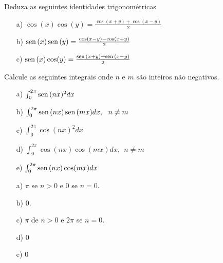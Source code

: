 \begin{exer} Deduza as seguintes identidades trigonométricas
\begin{itemize}
\item[a)] $\cos(x) \cos(y) = \frac {\cos(x+y) + \cos(x-y)}{2}$
\item[b)] $\operatorname{sen}\,(x) \operatorname{sen}\,(y) = \frac {\cos(x-y) - \cos(x+y)}{2}$
\item[c)] $\operatorname{sen}\,(x) \cos(y) = \frac {\operatorname{sen}\,(x+y) + \operatorname{sen}\,(x-y)}{2}$
\end{itemize}
\end{exer}
\begin{exer}Calcule as seguintes integrais onde $n$ e $m$ são inteiros não negativos.
\begin{itemize}
\item [a)] $\int_0^{2\pi}\operatorname{sen}\,(nx)^2dx$
\item [b)] $\int_0^{2\pi}\operatorname{sen}\,(nx)\operatorname{sen}\,(mx)dx,~~n\neq m$
\item [c)] $\int_0^{2\pi}\cos(nx)^2dx$
\item [d)] $\int_0^{2\pi}\cos(nx)\cos(mx)dx,~~n\neq m$
\item [e)] $\int_0^{2\pi}\operatorname{sen}\,(nx)\cos(mx)dx$
\end{itemize}
\end{exer}
\begin{resp}
\begin{itemize}
\item [a)] $\pi$ se $n>0$ e $0$ se $n=0$.
\item [b)] $0$.
\item [c)] $\pi$ de $n>0$ e $2\pi$ se $n=0$.
\item [d)] $0$
\item [e)] $0$
\end{itemize}
\end{resp}

